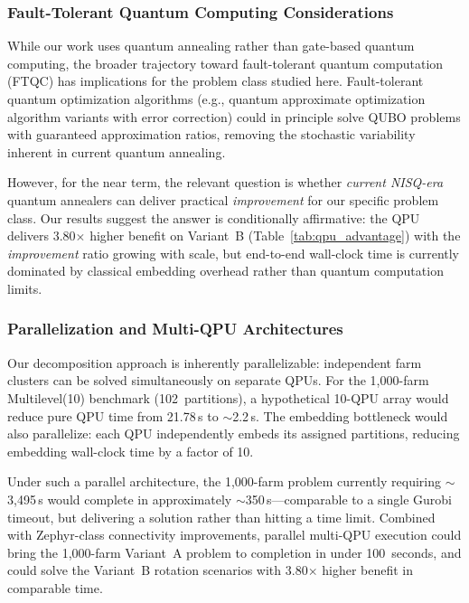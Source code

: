\subsubsection{Fault-Tolerant Quantum Computing Considerations}

While our work uses quantum annealing rather than gate-based quantum computing, the broader trajectory toward fault-tolerant quantum computation (FTQC) has implications for the problem class studied here. Fault-tolerant quantum optimization algorithms (e.g., quantum approximate optimization algorithm variants with error correction) could in principle solve QUBO problems with guaranteed approximation ratios, removing the stochastic variability inherent in current quantum annealing.

However, for the near term, the relevant question is whether \textit{current NISQ-era} quantum annealers can deliver practical \textit{improvement} for our specific problem class. Our results suggest the answer is conditionally affirmative: the QPU delivers 3.80$\times$ higher benefit on Variant~B (Table~\ref{tab:qpu_advantage}) with the \textit{improvement} ratio growing with scale, but end-to-end wall-clock time is currently dominated by classical embedding overhead rather than quantum computation limits.

\subsubsection{Parallelization and Multi-QPU Architectures}

Our decomposition approach is inherently parallelizable: independent farm clusters can be solved simultaneously on separate QPUs. For the 1,000-farm Multilevel(10) benchmark (102~partitions), a hypothetical 10-QPU array would reduce pure QPU time from 21.78\,s to $\sim$2.2\,s. The embedding bottleneck would also parallelize: each QPU independently embeds its assigned partitions, reducing embedding wall-clock time by a factor of 10.

Under such a parallel architecture, the 1,000-farm problem currently requiring $\sim$3,495\,s would complete in approximately $\sim$350\,s---comparable to a single Gurobi timeout, but delivering a solution rather than hitting a time limit. Combined with Zephyr-class connectivity improvements, parallel multi-QPU execution could bring the 1,000-farm Variant~A problem to completion in under 100~seconds, and could solve the Variant~B rotation scenarios with 3.80$\times$ higher benefit in comparable time.

